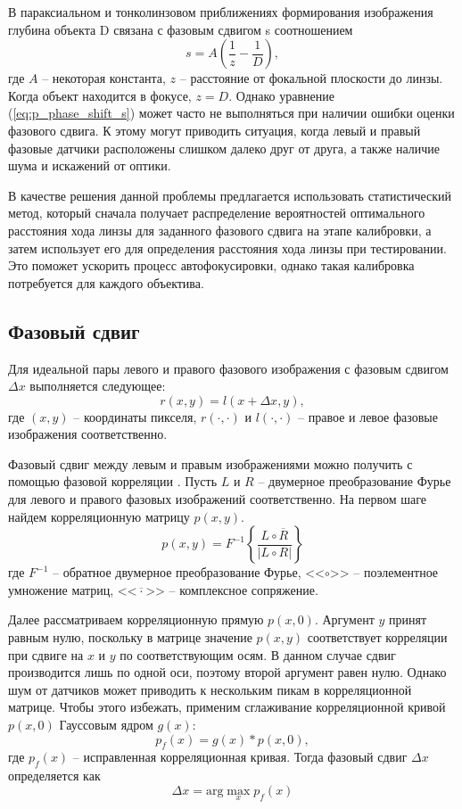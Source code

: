 В параксиальном и тонколинзовом приближениях формирования изображения глубина объекта D связана с фазовым сдвигом s соотношением \cite{AF-Net}
\begin{equation}
	s = A\left( \frac{1}{z} - \frac{1}{D}\right),
	\label{eq:p_phase_shift_s}
\end{equation}
где $A$ -- некоторая константа, $z$ -- расстояние от фокальной плоскости до линзы. Когда объект находится в фокусе, $z = D$. Однако уравнение (\ref{eq:p_phase_shift_s}) может часто не выполняться при наличии ошибки оценки фазового сдвига. К этому могут приводить ситуация, когда левый и правый фазовые датчики расположены слишком далеко друг от друга, а также наличие шума и искажений от оптики.

В качестве решения данной проблемы предлагается использовать статистический метод, который сначала получает распределение вероятностей оптимального расстояния хода линзы для заданного фазового сдвига на этапе калибровки, а затем использует его для определения расстояния хода линзы при тестировании. Это поможет ускорить процесс автофокусировки, однако такая калибровка потребуется для каждого объектива.

\subsection{Фазовый сдвиг}
Для идеальной пары левого и правого фазового изображения с фазовым сдвигом $\Delta x$ выполняется следующее:
\begin{equation}
	r(x, y) = l(x + \Delta x, y),
\end{equation}
где $(x, y)$ -- координаты пикселя, $r(\cdot,\cdot)$ и $l(\cdot,\cdot)$ -- правое и левое фазовые изображения соответственно.

Фазовый сдвиг между левым и правым изображениями можно получить с помощью фазовой корреляции \cite{PhaseCorrelation}. Пусть $L$ и $R$ -- двумерное преобразование Фурье для левого и правого фазовых изображений соответственно. На первом шаге найдем корреляционную матрицу $p(x, y)$.
\begin{equation}
	p(x, y) = F^{-1} \left\{ \frac{L \circ \overline{R}}{\left| L \circ R \right|} \right\}
\end{equation}
где $F^{-1}$ -- обратное двумерное преобразование Фурье, <<$\circ$>> -- поэлементное умножение матриц, <<$\overline{\cdot}$>> -- комплексное сопряжение.

Далее рассматриваем корреляционную прямую $p(x,0)$. Аргумент $y$ принят равным нулю, поскольку в матрице значение $p(x,y)$ соответствует корреляции при сдвиге на $x$ и $y$ по соответствующим осям. В данном случае сдвиг производится лишь по одной оси, поэтому второй аргумент равен нулю. Однако шум от датчиков может приводить к нескольким пикам в корреляционной матрице. Чтобы этого избежать, применим сглаживание корреляционной кривой $p(x,0)$ Гауссовым ядром $g(x)$:
\begin{equation}
	p_f(x) = g(x) * p(x, 0),
\end{equation}
где $p_f(x)$ -- исправленная корреляционная кривая. Тогда фазовый сдвиг $\Delta x$ определяется как
\begin{equation}
	\Delta x = \text{arg} \max_x p_f(x)
\end{equation} 

